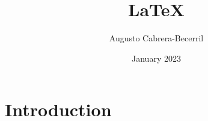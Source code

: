 \documentclass{article}
\title{LaTeX}
\author{Augusto Cabrera-Becerril}
\date{January 2023}
\begin{document}
\maketitle

\section{Introduction}
\end{document}
